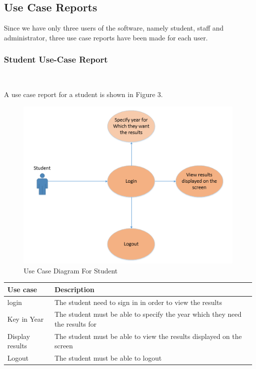\documentclass[10pt,onecolumn]{lab}
\begin{document}
\subsection{Use Case Reports}
Since we have only three users of the software, namely student, staff and administrator, three use case reports have been made for each user. 
 

\clearpage
\subsubsection{Student Use-Case Report}$\;\;\;\;\;\;\;\;\;\;\;\;\;\;\;\;\;\;\;\;\;\;\;$

A use case report for a student is shown in Figure 3.
\begin{center}
\begin{figure}[h]
\centering
\includegraphics[trim={0cm 0cm 0cm 0cm },clip,scale = 1.1]{StudentUsecase}
\caption{Use Case Diagram For Student}
\end{figure}
\end{center}



\begin{center}
    \begin{tabular}{ | p{2cm} | p{10cm}| }
    \hline
    \textbf{Use case}& \textbf{Description} \\ \hline
    login & The student need to sign in in order to view the results \\ \hline
    Key in Year & The student must be able to specify the year which they need the results for  \\ \hline
    Display results & The student must be able to view the results displayed on the screen \\ \hline
    Logout          & The student must be able to logout  \\ \hline

    \end{tabular}
\end{center}
\end{document}
